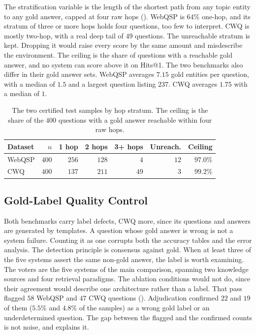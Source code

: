 The stratification variable is the length of the shortest path from any topic
entity to any gold answer, capped at four raw hops (). WebQSP
is $64\%$ one-hop, and its stratum of three or more hops holds four questions,
too few to interpret. CWQ is mostly two-hop, with a real deep tail of $49$
questions. The \textsf{unreachable} stratum is kept. Dropping it would raise
every score by the same amount and misdescribe the environment. The ceiling is
the share of questions with a reachable gold answer, and no system can score
above it on Hits@1. The two benchmarks also differ in their gold answer sets.
WebQSP averages $7.15$ gold entities per question, with a median of $1.5$ and a
largest question listing $237$. CWQ averages $1.75$ with a median of $1$.

\begin{table}[!t]
\caption{The two certified test samples by hop stratum. The ceiling is the share
  of the $400$ questions with a gold answer reachable within four raw hops.}
\label{tab:testsets}
\centering
\small
\setlength{\tabcolsep}{4.5pt}
\begin{tabular}{@{}lrrrrrr@{}}
\toprule
Dataset & $n$ & 1 hop & 2 hops & 3+ hops & Unreach. & Ceiling \\
\midrule
WebQSP & $400$ & $256$ & $128$ & $4$ & $12$ & $97.0\%$ \\
CWQ & $400$ & $137$ & $211$ & $49$ & $3$ & $99.2\%$ \\
\bottomrule
\end{tabular}
\end{table}

\subsection{Gold-Label Quality Control}\label{sec:gold}

Both benchmarks carry label defects, CWQ more, since its questions and answers
are generated by templates. A question whose gold answer is wrong is not a
system failure. Counting it as one corrupts both the accuracy tables and the
error analysis. The detection principle is consensus against gold. When at least
three of the five systems assert the same non-gold answer, the label is worth
examining. The voters are the five systems of the main comparison, spanning two
knowledge sources and four retrieval paradigms. The ablation conditions would
not do, since their agreement would describe one architecture rather than a
label. That pass flagged $58$ WebQSP and $47$ CWQ questions ().
Adjudication confirmed $22$ and $19$ of them ($5.5\%$ and $4.8\%$ of the
samples) as a wrong gold label or an underdetermined question. The gap between
the flagged and the confirmed counts is not noise, and  explains
it.

